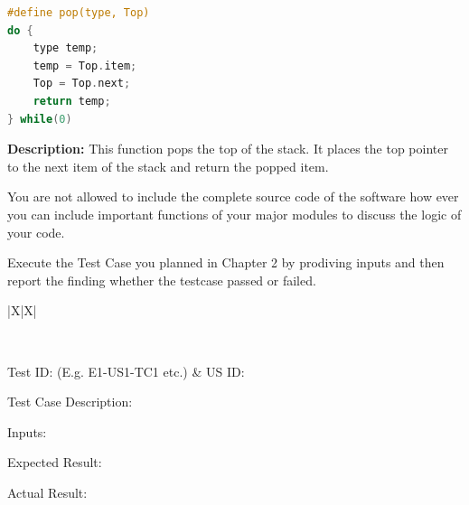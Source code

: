 \begin{lstlisting}[language=C]
#define pop(type, Top) 
do { 
    type temp; 
    temp = Top.item; 
    Top = Top.next; 
    return temp; 
} while(0)
\end{lstlisting}

\textbf{Description:} This function pops the top of the stack. It places the top pointer to the next item of the stack and return the popped item.

You are not allowed to include the complete source code of the software how ever you can include important functions of your major modules to discuss the logic of your code.


Execute the Test Case you planned in Chapter 2 by prodiving inputs and then report the finding whether the testcase passed or failed.

{
\setModernTableStyle %
\begin{xltabular}{\textwidth}{|X|X|}

    \hiderowcolors
    \caption{Test Case 1} \label{tab:test_case_ch4_2} \\
    \hline
    \showrowcolors

    Test ID: (E.g. E1-US1-TC1 etc.) & US ID: \\ \hline

    {Test Case Description: } \\ \hline

    {Inputs:} \\ \hline

    {Expected Result:} \\ \hline

    {Actual Result:} \\ \hline

\end{xltabular}
}

\setcounter{chapter}{4}           
